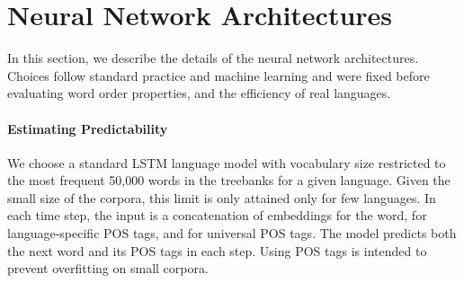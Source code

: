 \documentclass[10pt,twoside,lineno]{article}
\begin{document}







\section{Neural Network Architectures}\label{sec:neural-architectures}

In this section, we describe the details of the neural network architectures.
Choices follow standard practice and machine learning and were fixed before evaluating word order properties, and the efficiency of real languages.


\paragraph{Estimating Predictability}
We choose a standard LSTM \citep{hochreiter1997long} language model with vocabulary size restricted to the most frequent 50,000 words in the treebanks for a given language.
Given the small size of the corpora, this limit is only attained only for few languages.
In each time step, the input is a concatenation of embeddings for the word, for language-specific POS tags, and for universal POS tags.
The model predicts both the next word and its POS tags in each step.
Using POS tags is intended to prevent overfitting on small corpora.
\end{document}
